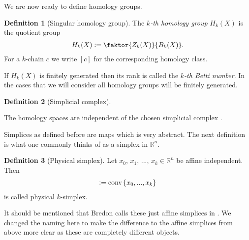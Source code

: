 \documentclass[12pt,a4paper]{article}
\newtheorem{proposition}{Proposition}
\theoremstyle{definition}
\newtheorem{definition}{Definition}
\newcommand{\real}{\mathbb{R}}
\begin{document}


We are now ready to define homology groups.
\begin{definition}[Singular homology group]
    The \textit{$k$-th homology group} $H_k(X)$ is the quotient group
    \begin{align*}
        H_k(X) \vcentcolon= \faktor{Z_k(X)}{B_k(X)}.
    \end{align*}
    For a $k$-chain $c$ we write $[c]$ for the corresponding homology class.
\end{definition}

If $H_k(X)$ is finitely generated then its rank is called the 
\textit{$k$-th Betti number}. In the cases that we will consider 
all homology groups will be finitely generated.


\begin{definition}[Simplicial complex]
    
\end{definition}

\noindent The homology spaces are independent of the chosen simplicial complex
\cite{}. %

Simplices as defined before are maps which is very abstract. The next 
definition is what one commonly thinks of as a simplex in $\real^n$. 
\begin{definition}[Physical simplex]
    Let $x_0$, $x_1$, ..., $x_k \in \real^n$ be affine independent. Then 
    \begin{align*}
    [x_0,x_1,...,x_k] \vcentcolon= \text{conv}\,\{x_0,...,x_k\}
    \end{align*}
    is called physical $k$-simplex.
\end{definition}
\noindent It should be mentioned that Bredon calls these just affine simplices
in \cite{topology_and_geometry}. We changed the naming here to make the 
difference to the affine simplices from above more clear as these are
completely different objects.
\end{document}
